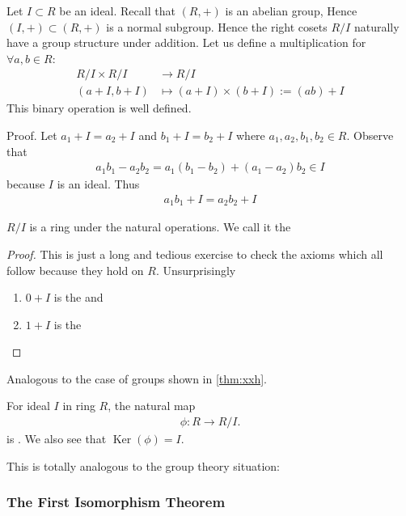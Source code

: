 \documentclass{article}
\newcommand{\Ker}{\operatorname{Ker}}
\begin{document}
\begin{lema}
Let $I \subset R$ be an ideal. Recall that $(R,+)$ is an abelian group, Hence $(I,+) \subset(R,+)$ is a normal subgroup. Hence the right cosets $R / I$ naturally have a group structure under addition.  Let us define a multiplication for $\forall a, b \in R$:
\begin{align*}
R/I \times R/I &\rightarrow R/I\\
(a+I, b+I) &\mapsto (a+I) \times(b+I):=(a b)+I
\end{align*}This binary operation is well defined.
\end{lema}
Proof. Let $a_{1}+I=a_{2}+I$ and $b_{1}+I=b_{2}+I$ where $a_{1}, a_{2}, b_{1}, b_{2} \in R$. Observe that
\begin{align*}
a_{1} b_{1}-a_{2} b_{2}=a_{1}\left(b_{1}-b_{2}\right)+\left(a_{1}-a_{2}\right) b_{2} \in I
\end{align*}
because $I$ is an ideal. Thus
\begin{align*}
a_{1} b_{1}+I=a_{2} b_{2}+I
\end{align*}
\begin{lema}
$R / I$ is a ring under the natural operations. We call it the 
\end{lema}
\begin{proof}
This is just a long and tedious exercise to check the axioms which all follow because they hold on $R$. Unsurprisingly 
\begin{enumerate}
    \item $0+I$ is the  and
    \item $1+I$ is the 
\end{enumerate} 
\end{proof}
Analogous to the case of groups shown in \cref{thm:xxh}. 
\begin{thma}\label{thm:oqnezc}
For ideal $I$ in ring $R$, the natural map
\begin{align*}
\phi: R \rightarrow R / I .
\end{align*}
is . We also see that $\Ker(\phi)=I$.
\end{thma}

This is totally analogous to the group theory situation:

\centerline{}

\subsubsection{The First Isomorphism Theorem}
\end{document}
